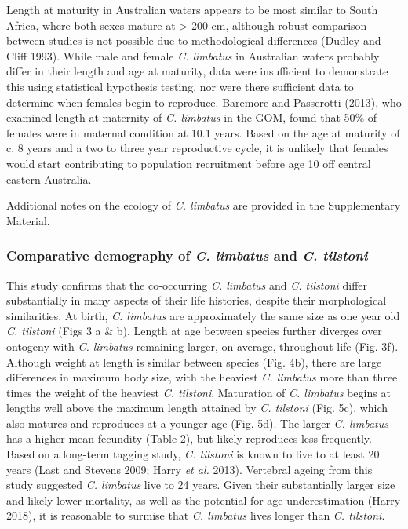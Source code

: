 \documentclass[]{article}
\begin{document}
Length at maturity in Australian waters appears to be most similar to
South Africa, where both sexes mature at \textgreater{} 200 cm, although
robust comparison between studies is not possible due to methodological
differences (Dudley and Cliff 1993). While male and female \emph{C.
limbatus} in Australian waters probably differ in their length and age
at maturity, data were insufficient to demonstrate this using
statistical hypothesis testing, nor were there sufficient data to
determine when females begin to reproduce. Baremore and Passerotti
(2013), who examined length at maternity of \emph{C. limbatus} in the
GOM, found that 50\% of females were in maternal condition at 10.1
years. Based on the age at maturity of c. 8 years and a two to three
year reproductive cycle, it is unlikely that females would start
contributing to population recruitment before age 10 off central eastern
Australia.

Additional notes on the ecology of \emph{C. limbatus} are provided in
the Supplementary Material.

\hypertarget{comparative-demography-of-c.-limbatus-and-c.-tilstoni}{%
\subsubsection{\texorpdfstring{Comparative demography of \emph{C.
limbatus} and \emph{C.
tilstoni}}{Comparative demography of C. limbatus and C. tilstoni}}\label{comparative-demography-of-c.-limbatus-and-c.-tilstoni}}

This study confirms that the co-occurring \emph{C. limbatus} and
\emph{C. tilstoni} differ substantially in many aspects of their life
histories, despite their morphological similarities. At birth, \emph{C.
limbatus} are approximately the same size as one year old \emph{C.
tilstoni} (Figs 3 a \& b). Length at age between species further
diverges over ontogeny with \emph{C. limbatus} remaining larger, on
average, throughout life (Fig. 3f). Although weight at length is similar
between species (Fig. 4b), there are large differences in maximum body
size, with the heaviest \emph{C. limbatus} more than three times the
weight of the heaviest \emph{C. tilstoni}. Maturation of \emph{C.
limbatus} begins at lengths well above the maximum length attained by
\emph{C. tilstoni} (Fig. 5c), which also matures and reproduces at a
younger age (Fig. 5d). The larger \emph{C. limbatus} has a higher mean
fecundity (Table 2), but likely reproduces less frequently. Based on a
long-term tagging study, \emph{C. tilstoni} is known to live to at least
20 years (Last and Stevens 2009; Harry \emph{et al.} 2013). Vertebral
ageing from this study suggested \emph{C. limbatus} live to 24 years.
Given their substantially larger size and likely lower mortality, as
well as the potential for age underestimation (Harry 2018), it is
reasonable to surmise that \emph{C. limbatus} lives longer than \emph{C.
tilstoni}.
\end{document}
